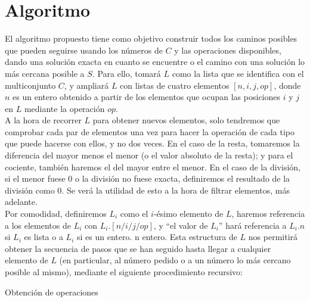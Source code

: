 \section{Algoritmo}
El algoritmo propuesto tiene como objetivo construir todos los caminos posibles
que pueden seguirse usando los números de $C$ y las operaciones disponibles,
dando una solución exacta en cuanto se encuentre o el camino con una solución lo
 más cercana posible a $S$. Para ello, tomará $L$ como la lista que se
identifica con el multiconjunto $C$, y ampliará $L$ con listas de cuatro elementos
$[n, i, j, op]$, donde $n$ es un entero obtenido a partir de los elementos que ocupan
las posiciones $i$ y $j$ en $L$ mediante la operación $op$.\\

A la hora de recorrer $L$ para obtener nuevos elementos, solo tendremos que
comprobar cada par de elementos una vez para hacer la operación de cada tipo que
puede hacerse con ellos, y no dos veces. En el caso de la resta, tomaremos la
diferencia del mayor menos el menor (o el valor absoluto de la resta); y para
el cociente, también haremos el del mayor entre el menor. En el caso de la
división, si el menor fuese $0$ o la división no fuese exacta, definiremos el
resultado de la división como $0$. Se verá la utilidad de esto a la hora de
filtrar elementos, más adelante. \\

Por comodidad,
definiremos $L_i$ como el $i$-ésimo elemento de $L$, haremos referencia a los
elementos de $L_i$ con $L_i.[n/i/j/op]$, y ``el valor de $L_i$'' hará referencia
a $L_i.n$ si $L_i$ es lista o a $L_i$ si es un entero.
n entero. Esta estructura de $L$ nos permitirá obtener la secuencia de pasos que
se han seguido hasta llegar a cualquier elemento de $L$ (en particular, al número
pedido o a un número lo más cercano posible al mismo),
mediante el siguiente procedimiento recursivo: \\

\begin{algorithm}[H]
\caption{Obtención de operaciones}
\end{algorithm}

